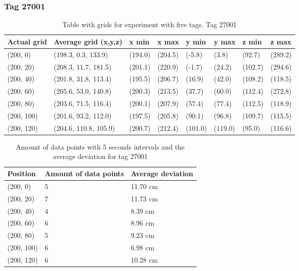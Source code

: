 \subsubsection{Tag 27001}
\begin{table}[H] 
    \begin{tabular}{|l|l|l|l|l|l|l|l|}
    \hline
Actual grid & Average grid (x,y,z)   & x min   & x max   & y min    & y max   & z min   & z max    \\ \hline
(200, 0) 	& (198.3, 0.3, 133.9) 	 & (194.0) 	& (204.5)	& (-5.8)	 & (3.8) 	 & (92.7)	 & (289.2)	\\ \hline
(200, 20) 	& (208.3, 11.7, 181.5) 	 & (201.1) 	& (220.9)	& (-1.7)	 & (24.2) 	 & (102.7)	 & (294.6)	\\ \hline
(200, 40) 	& (201.8, 31.8, 113.4) 	 & (195.5) 	& (206.7)	& (16.9)	 & (42.0) 	 & (108.2)	 & (118.5)	\\ \hline
(200, 60) 	& (205.6, 53.0, 140.8) 	 & (200.3) 	& (213.5)	& (37.7)	 & (60.0) 	 & (112.4)	 & (272.8)	\\ \hline
(200, 80) 	& (203.6, 71.5, 116.4) 	 & (200.1) 	& (207.9)	& (57.4)	 & (77.4) 	 & (112.5)	 & (118.9)	\\ \hline
(200, 100) 	& (201.6, 93.2, 112.0) 	 & (197.5) 	& (205.8)	& (90.1)	 & (96.8) 	 & (109.7)	 & (115.5)	\\ \hline
(200, 120) 	& (204.6, 110.8, 105.9)  & (200.7) 	& (212.4)	& (101.0)	 & (119.0) 	 & (95.0)	 & (116.6)	\\ \hline
\end{tabular}
\caption{Table with grids for experiment with five tags. Tag 27001}
\end{table}

\begin{table}[H]
    \begin{tabular}{|l|l|l|}
    \hline
    Position   & Amount of data points & Average deviation \\ \hline
    (200, 0)   & 5                     & 11.70 cm                  \\ \hline
    (200, 20)  & 7                     & 11.73 cm                  \\ \hline
    (200, 40)  & 4                     & 8.39 cm                  \\ \hline
    (200, 60)  & 6                     & 8.96 cm                  \\ \hline
    (200, 80)  & 5                     & 9.23 cm                  \\ \hline
    (200, 100) & 6                     & 6.98 cm                  \\ \hline
    (200, 120) & 6                     & 10.28 cm                  \\ \hline
    \end{tabular}
    \caption{Amount of data points with 5 seconds intervals and the average deviation for tag 27001}
\end{table}

